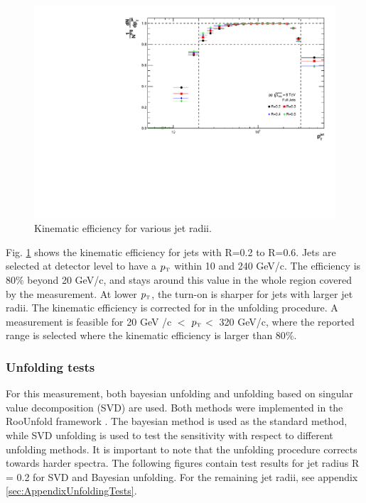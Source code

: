 \documentclass[ALICE]{ALICE_analysis_notes}
\newcommand{\pT}{$p_{\mbox{\tiny T}}$\xspace}
\begin{document}
\begin{figure}
    \centering
    \includegraphics[width=15cm]{figures/KinematicEfficiency/EffKine.pdf}
    \caption{Kinematic efficiency for various jet radii.}
    \label{fig:KinematicEfficiency}
\end{figure}

Fig. \ref{fig:KinematicEfficiency} shows the kinematic efficiency for jets with R=0.2 to R=0.6. Jets are selected at detector level to have a \pT within 10 and 240 GeV/c. The efficiency is 80$\%$ beyond 20 GeV/c, and stays around this value in the whole region covered by the measurement. At lower \pT, the turn-on is sharper for jets with larger jet radii. The kinematic efficiency is corrected for in the unfolding procedure. A measurement is feasible for 20 GeV /c $<$ \pT $<$ 320 GeV/c, where the reported range is selected where the kinematic efficiency is larger than 80$\%$.

\subsubsection{Unfolding tests}
\label{subsec:unfoldingTests}

For this measurement, both bayesian unfolding and unfolding based on singular value decomposition (SVD) are used. Both methods were implemented in the RooUnfold framework \cite{roounfold}. The bayesian method is used as the standard method, while SVD unfolding is used to test the sensitivity with respect to different unfolding methods. It is important to note that the unfolding procedure corrects towards harder spectra. The following figures contain test results for jet radius R = 0.2 for SVD and Bayesian unfolding. For the remaining jet radii, see appendix \ref{sec:AppendixUnfoldingTests}.
\end{document}
